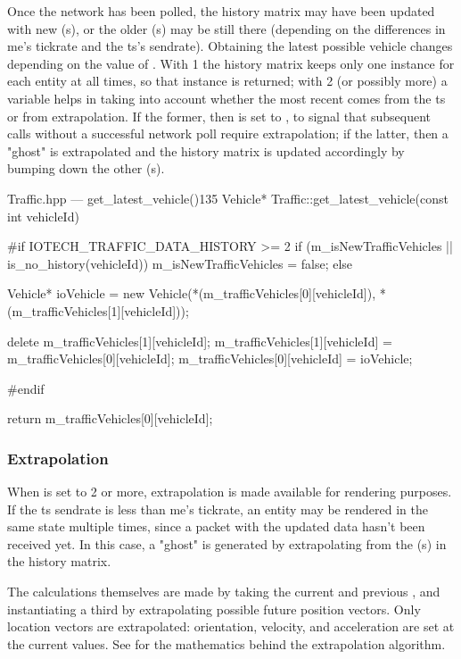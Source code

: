 Once the network has been polled, the history matrix may have been updated with new (s), or the older (s) may be still there (depending on the differences in \gls{me}'s tickrate and the \gls{ts}'s sendrate). Obtaining the latest possible vehicle changes depending on the value of . With \num{1} the history matrix keeps only one instance for each entity at all times, so that instance is returned; with \num{2} (or possibly more) a variable helps in taking into account whether the most recent  comes from the \gls{ts} or from extrapolation. If the former, then  is set to , to signal that subsequent calls without a successful network poll require extrapolation; if the latter, then a "ghost"  is extrapolated and the history matrix is updated accordingly by bumping down the other (s).

\begin{codelist}{Traffic.hpp --- get\_latest\_vehicle()}{135}
Vehicle* Traffic::get_latest_vehicle(const int vehicleId) {
#if IOTECH_TRAFFIC_DATA_HISTORY >= 2
    if (m_isNewTrafficVehicles || is_no_history(vehicleId)) {
        m_isNewTrafficVehicles = false;
    } else {
        Vehicle* ioVehicle = new Vehicle(*(m_trafficVehicles[0][vehicleId]), *(m_trafficVehicles[1][vehicleId]));

        delete m_trafficVehicles[1][vehicleId];
        m_trafficVehicles[1][vehicleId] = m_trafficVehicles[0][vehicleId];
        m_trafficVehicles[0][vehicleId] = ioVehicle;
    }
#endif

    return m_trafficVehicles[0][vehicleId];
}
\end{codelist}

\subsubsection{Extrapolation}

When  is set to \num{2} or more, extrapolation is made available for rendering purposes. If the \gls{ts} sendrate is less than \gls{me}'s tickrate, an entity may be rendered in the same state multiple times, since a packet with the updated data hasn't been received yet. In this case, a "ghost"  is generated by extrapolating from the (s) in the history matrix.

The calculations themselves are made by taking the current and previous , and instantiating a third  by extrapolating possible future position vectors. Only location vectors are extrapolated: orientation, velocity, and acceleration are set at the current values. See  for the mathematics behind the extrapolation algorithm.

